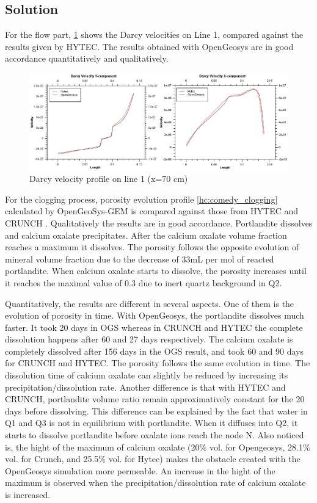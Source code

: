 \subsection{Solution}
For the flow part, \ref{hc:comedy_flow_field} shows the Darcy velocities on Line 1, compared against the results given by HYTEC. The results obtained with OpenGeosys are in good accordance quantitatively and qualitatively.

\begin{figure}[!htb]
  \begin{center}
  \includegraphics[scale=1.0]{PART_III/HC/comedy_flow.eps}
  \end{center}
  \caption{Darcy velocity profile on line 1 (x=70 cm)}
  \label{hc:comedy_flow_field}
\end{figure}

For the clogging process, porosity evolution profile \ref{hc:comedy_clogging} calculated by OpenGeoSys-GEM is compared against those from HYTEC and CRUNCH \cite{Cochepin2008}. Qualitatively the results are in good accordance. Portlandite dissolves and calcium oxalate precipitates. After the calcium oxalate volume fraction reaches a maximum it dissolves. The porosity follows the opposite evolution of mineral volume fraction due to the decrease of 33mL per mol of reacted portlandite. When calcium oxalate starts to dissolve, the porosity increases until it reaches the maximal value of 0.3 due to inert quartz background in Q2. 

Quantitatively, the results are different in several aspects. One of them is the evolution of porosity in time. With OpenGeosys, the portlandite dissolves much faster. It took 20 days in OGS whereas in CRUNCH and HYTEC the complete dissolution happens after 60 and 27 days respectively. The calcium oxalate is completely dissolved after 156 days in the OGS result, and took 60 and 90 days for CRUNCH and HYTEC. The porosity follows the same evolution in time. The dissolution time of calcium oxalate can slightly be reduced by increasing its precipitation/dissolution rate. Another difference is that with HYTEC and CRUNCH, portlandite volume ratio remain approximatively constant for the 20 days before dissolving. This difference can be explained by the fact that water in Q1 and Q3 is not in equilibrium with portlandite. When it diffuses into Q2, it starts to dissolve portlandite before oxalate ions reach the node N. Also noticed is, the hight of the maximum of calcium oxalate (20\% vol. for Opengeosys, 28.1\% vol. for Crunch, and 25.5\% vol. for Hytec) makes the obstacle created with the OpenGeosys simulation more permeable. An increase in the hight of the maximum is observed when the precipitation/dissolution rate of calcium oxalate is increased. 

